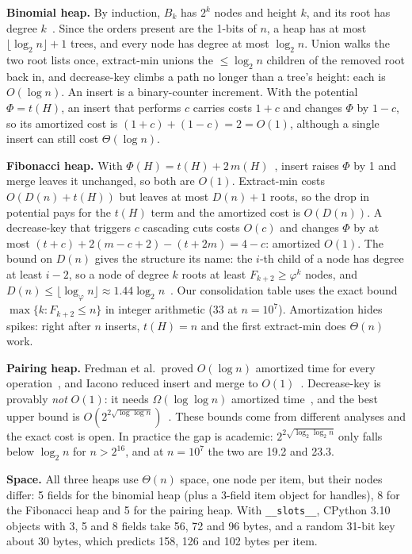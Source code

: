 \documentclass[acmsmall,nonacm]{acmart}
\newcommand{\code}[1]{\texttt{#1}}
\begin{document}
\textbf{Binomial heap.} By induction, $B_k$ has $2^k$ nodes and height $k$,
and its root has degree $k$~\cite[Lemma~19.1]{cormen2001}. Since the orders
present are the 1-bits of $n$, a heap has at most $\lfloor\log_2 n\rfloor + 1$
trees, and every node has degree at most $\log_2 n$. Union walks the two root
lists once, extract-min unions the $\le \log_2 n$ children of the removed root
back in, and decrease-key climbs a path no longer than a tree's height: each is
$O(\log n)$. An insert is a binary-counter increment. With the potential
$\Phi = t(H)$, an insert that performs $c$ carries costs $1+c$ and changes
$\Phi$ by $1-c$, so its amortized cost is $(1+c)+(1-c) = 2 = O(1)$, although a
single insert can still cost $\Theta(\log n)$.

\textbf{Fibonacci heap.} With $\Phi(H) = t(H) + 2\,m(H)$~\cite{fredman1987},
insert raises $\Phi$ by 1 and merge leaves it unchanged, so both are $O(1)$.
Extract-min costs $O(D(n) + t(H))$ but leaves at most $D(n)+1$ roots, so the
drop in potential pays for the $t(H)$ term and the amortized cost is
$O(D(n))$. A decrease-key that triggers $c$ cascading cuts costs $O(c)$ and
changes $\Phi$ by at most $(t+c) + 2(m-c+2) - (t+2m) = 4-c$: amortized $O(1)$.
The bound on $D(n)$ gives the structure its name: the $i$-th child of a node
has degree at least $i-2$, so a node of degree $k$ roots at least
$F_{k+2} \ge \varphi^k$ nodes, and $D(n) \le \lfloor\log_\varphi n\rfloor \approx
1.44\log_2 n$~\cite[Lemma~19.4, Cor.~19.5]{cormen2009}. Our consolidation table
uses the exact bound $\max\{k : F_{k+2} \le n\}$ in integer arithmetic (33 at
$n = 10^7$). Amortization hides spikes: right after $n$ inserts, $t(H) = n$ and
the first extract-min does $\Theta(n)$ work.

\textbf{Pairing heap.} Fredman et al.\ proved $O(\log n)$ amortized time for
every operation~\cite{fredman1986}, and Iacono reduced insert and merge to
$O(1)$~\cite{iacono2000}. Decrease-key is provably \emph{not} $O(1)$: it needs
$\Omega(\log\log n)$ amortized time~\cite{fredman1999,iacono2014}, and the best
upper bound is $O(2^{2\sqrt{\log\log n}})$~\cite{pettie2005}. These bounds come
from different analyses and the exact cost is open. In practice the gap is
academic: $2^{2\sqrt{\log_2\log_2 n}}$ only falls below $\log_2 n$ for
$n > 2^{16}$, and at $n = 10^7$ the two are 19.2 and 23.3.

\textbf{Space.} All three heaps use $\Theta(n)$ space, one node per item, but
their nodes differ: 5 fields for the binomial heap (plus a 3-field item object
for handles), 8 for the Fibonacci heap and 5 for the pairing heap. With
\code{\_\_slots\_\_}, CPython 3.10 objects with 3, 5 and 8 fields take 56, 72 and
96 bytes, and a random 31-bit key about 30 bytes, which predicts 158, 126 and
102 bytes per item.
\end{document}
